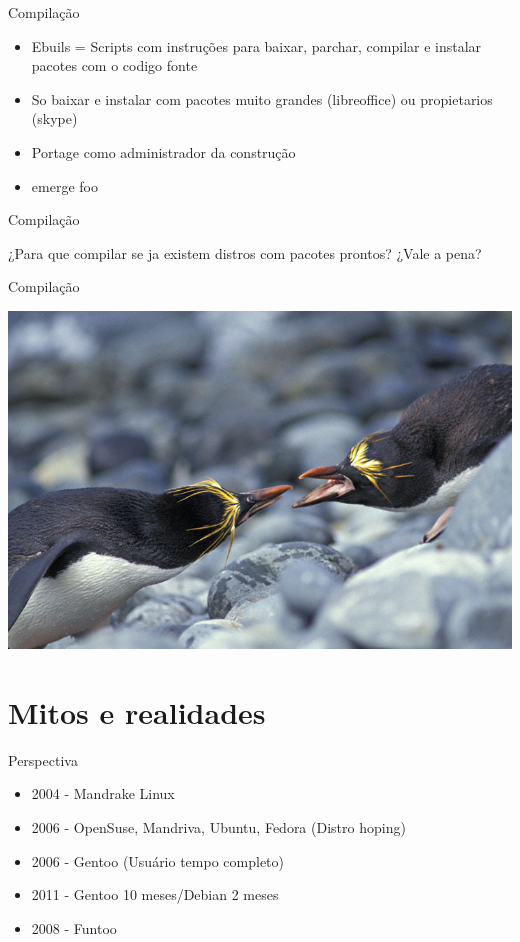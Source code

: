 \documentclass{beamer}
\begin{document}
\begin{frame}{Compilação}
\begin{itemize}
\item Ebuils = Scripts com instruções para baixar, parchar, compilar e instalar pacotes com o codigo fonte
\item So baixar e instalar com pacotes muito grandes (libreoffice) ou propietarios (skype)
\item Portage como administrador da construção
\item emerge foo
\end{itemize}
\end{frame}

\begin{frame}{Compilação}
\begin{center}
¿Para que compilar se ja existem distros com pacotes prontos?
¿Vale a pena?
\end{center}
\end{frame}

\begin{frame}{Compilação}
\begin{center}
\includegraphics[width=0.7\linewidth]{./fightpen}
\end{center}
\end{frame}

\section{Mitos e realidades}
\begin{frame}{Perspectiva}
\begin{itemize}
\item 2004 - Mandrake Linux
\item 2006 - OpenSuse, Mandriva, Ubuntu, Fedora (Distro hoping)
\item 2006 - Gentoo (Usuário tempo completo)
\item 2011 - Gentoo 10 meses/Debian 2 meses
\item 2008 - Funtoo
\end{itemize}
\end{frame}
\end{document}
